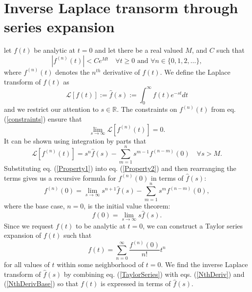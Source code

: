 \documentclass[extra]{gji}
\begin{document}
\appendix
\section{Inverse Laplace transorm through series expansion}
let $f(t)$ be analytic at $t=0$ and let there
  be a real valued $M$, and $C$ such that
\begin{equation}\label{constraints}
  \left|f^{(n)}(t)\right| < Ce^{Mt}\quad \forall t\geq 0\text{ and }\forall n\in\{0,1,2,\dots\},
\end{equation}
where $f^{(n)}(t)$ denotes the $n^{th}$ derivative of $f(t)$.  We
define the Laplace transform of $f(t)$ as
\begin{equation}
  \mathcal{L}[f(t)] := \hat{f}(s) := \int_{0}^\infty f(t)e^{-st}dt
\end{equation}
and we restrict our attention to $s\in\mathbb{R}$.  The constraints on
$f^{(n)}(t)$ from eq. (\ref{constraints}) ensure that
\begin{equation}\label{Property2}
  \lim_{s \to \infty}\mathcal{L}[f^{(n)}(t)] = 0.
\end{equation}
It can be shown using integration by parts that
\begin{equation}\label{Property1}
  \mathcal{L}[f^{(n)}(t)] = s^n\hat{f}(s) - \sum_{m=1}^ns^{m-1}f^{(n-m)}(0)
  \quad \forall s>M.
\end{equation}
Substituting eq. (\ref{Property1}) into eq. (\ref{Property2}) and then
rearranging the terms gives us a recursive formula for $f^{(n)}(0)$ in
terms of $\hat{f}(s)$:
\begin{equation}\label{NthDeriv}
  f^{(n)}(0) = \lim_{s \to \infty} s^{n + 1}\hat{f}(s) -
               \sum_{m=1}^{n} s^{m}f^{(n-m)}(0),
\end{equation}
where the base case, $n=0$, is the initial value theorem:
\begin{equation}\label{NthDerivBase}
  f(0) = \lim_{s \to \infty} s\hat{f}(s).
\end{equation}
Since we request $f(t)$ to be analytic at $t=0$, we can construct a
Taylor series expansion of $f(t)$ such that
\begin{equation}\label{TaylorSeries}
  f(t) = \sum_{n=0}^\infty\frac{f^{(n)}(0)}{n!}t^n
\end{equation}
for all values of $t$ within some neighborhood of $t=0$. We find the
inverse Laplace transform of $\hat{f}(s)$ by combining
eq. (\ref{TaylorSeries}) with eqs. (\ref{NthDeriv}) and
(\ref{NthDerivBase}) so that $f(t)$ is expressed in terms of
$\hat{f}(s)$.
\end{document}
